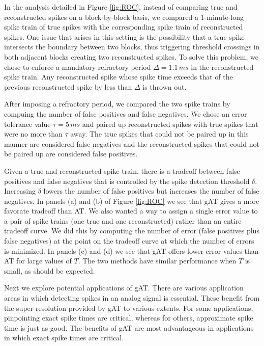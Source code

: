 \documentclass[journal]{IEEEtran}
\begin{document}
In the analysis detailed in Figure \ref{fig:ROC}, instead of comparing true and reconstructed spikes on a block-by-block basis, we compared a 1-minute-long spike train of true spikes with the corresponding spike train of reconstructed spikes. One issue that arises in this setting is the possibility that a true spike intersects the boundary between two blocks, thus triggering threshold crossings in both adjacent blocks creating two reconstructed spikes. To solve this problem, we chose to enforce a mandatory refractory period $\Delta = 1.1\,ms$ in the reconstructed spike train. Any reconstructed spike whose spike time exceeds that of the previous reconstructed spike by less than $\Delta$ is thrown out.

After imposing a refractory period, we compared the two spike trains by compuing the number of false positives and false negatives. We chose an error tolerance value $\tau = 5\,ms$ and paired up reconstructed spikes with true spikes that were no more than $\tau$ away. The true spikes that could not be paired up in this manner are considered false negatives and the reconstructed spikes that could not be paired up are considered false positives.

Given a true and reconstructed spike train, there is a tradeoff between false positives and false negatives that is controlled by the spike detection threshold $\delta$. Increasing $\delta$ lowers the number of false positives but increases the number of false negatives. In panels (a) and (b) of Figure \ref{fig:ROC} we see that gAT gives a more favorate tradeoff than AT. We also wanted a way to assign a single error value to a pair of spike trains (one true and one reconstructed) rather than an entire tradeoff curve. We did this by computing the number of error (false positives plus false negatives) at the point on the tradeoff curve at which the number of errors is minimized. In panels (c) and (d) we see that gAT offers lower error values than AT for large values of $T$. The two methods have similar performance when $T$ is small, as should be expected.

Next we explore potential applications of gAT. There are various application areas in which detecting spikes in an analog signal is essential. These benefit from the super-resolution provided by gAT to various extents. For some applications, pinpointing exact spike times are critical, whereas for others, approximate spike time is just as good. The benefits of gAT are most advantageous in applications in which exact spike times are critical.
\end{document}
